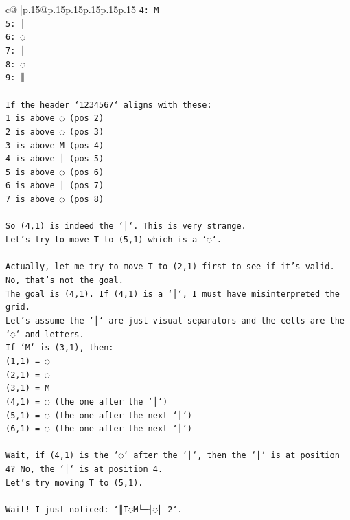 \documentclass{article}
\begin{document}
{\begin{supertabular}{c@{$\;$}|p{.15\linewidth}@{}p{.15\linewidth}p{.15\linewidth}p{.15\linewidth}p{.15\linewidth}p{.15\linewidth}}
{{{\texttt{4: M} \\
\texttt{5: │} \\
\texttt{6: ◌} \\
\texttt{7: │} \\
\texttt{8: ◌} \\
\texttt{9: ║} \\
\\ 
\texttt{If the header `1234567` aligns with these:} \\
\texttt{1 is above ◌ (pos 2)} \\
\texttt{2 is above ◌ (pos 3)} \\
\texttt{3 is above M (pos 4)} \\
\texttt{4 is above │ (pos 5)} \\
\texttt{5 is above ◌ (pos 6)} \\
\texttt{6 is above │ (pos 7)} \\
\texttt{7 is above ◌ (pos 8)} \\
\\ 
\texttt{So (4,1) is indeed the `│`. This is very strange.} \\
\texttt{Let's try to move T to (5,1) which is a `◌`.} \\
\\ 
\texttt{Actually, let me try to move T to (2,1) first to see if it's valid. No, that's not the goal.} \\
\texttt{The goal is (4,1). If (4,1) is a `│`, I must have misinterpreted the grid.} \\
\texttt{Let's assume the `│` are just visual separators and the cells are the `◌` and letters.} \\
\texttt{If `M` is (3,1), then:} \\
\texttt{(1,1) = ◌} \\
\texttt{(2,1) = ◌} \\
\texttt{(3,1) = M} \\
\texttt{(4,1) = ◌ (the one after the `│`)} \\
\texttt{(5,1) = ◌ (the one after the next `│`)} \\
\texttt{(6,1) = ◌ (the one after the next `│`)} \\
\\ 
\texttt{Wait, if (4,1) is the `◌` after the `│`, then the `│` is at position 4? No, the `│` is at position 4.} \\
\texttt{Let's try moving T to (5,1).} \\
\\ 
\texttt{Wait! I just noticed: `║T◌M└─┤◌║ 2`.} \\
}}}
\end{supertabular}}
\end{document}
